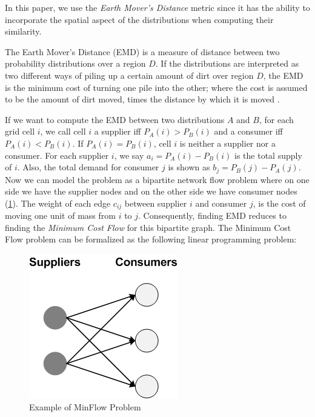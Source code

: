 In this paper, we use the \textit{Earth Mover's Distance} metric since it has the ability to incorporate the spatial aspect of the distributions when computing their similarity.

\begin{definition}
The Earth Mover's Distance (EMD) is a measure of distance between two probability distributions over a region $D$. If the distributions are interpreted as two different ways of piling up a certain amount of dirt over region $D$, the EMD is the minimum cost of turning one pile into the other; where the cost is assumed to be the amount of dirt moved, times the distance by which it is moved \cite{Rubner98}.
\end{definition}

If we want to compute the EMD between two distributions $A$ and $B$, for each grid cell $i$, we call cell $i$ a supplier iff $P_A(i) > P_B(i)$ and a consumer iff $P_A(i) < P_B(i)$. If $P_A(i) = P_B(i)$, cell $i$ is neither a supplier nor a consumer. For each supplier $i$, we say $a_i = P_A(i) - P_B(i)$ is the total supply of $i$. Also, the total demand for consumer $j$ is shown as $b_j = P_B(j) - P_A(j)$. Now we can model the problem as a bipartite network flow problem where on one side we have the supplier nodes and on the other side we have consumer nodes (\cref{fig:MinFlow}). The weight of each edge $c_{ij}$ between supplier $i$ and consumer $j$, is the cost of moving one unit of mass from $i$ to $j$.  Consequently, finding EMD reduces to finding the \textit{Minimum Cost Flow} for this bipartite graph. The Minimum Cost Flow problem can be formalized as the following linear programming problem:

\begin{figure}[t]
  \centering
  \label{fig:MinFlow}
  \includegraphics[scale=0.25]{figures/MinFlow.png}
  \caption{Example of MinFlow Problem}
\end{figure}


